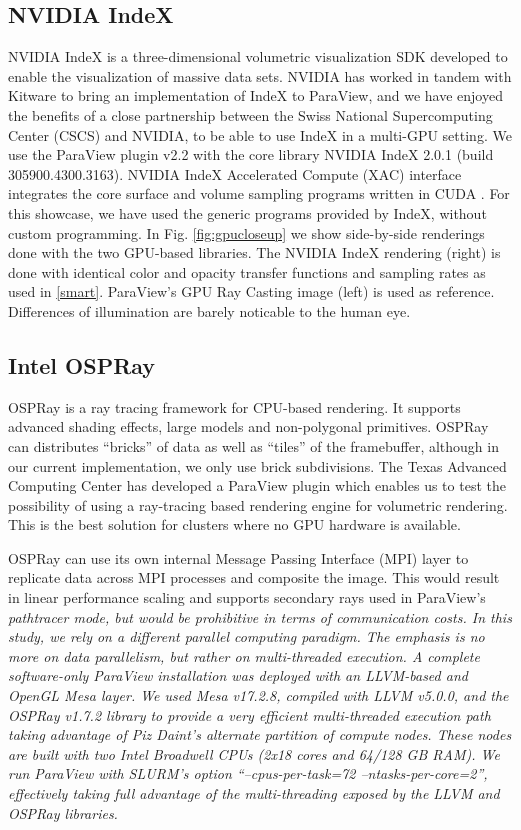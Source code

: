 \documentclass[5p,times]{elsarticle}
\begin{document}
\subsection{NVIDIA IndeX} \label{index}

NVIDIA IndeX \cite{NVIDIAIndeX} is a three-dimensional volumetric visualization SDK developed to enable
the visualization of massive data sets. NVIDIA has worked in tandem with Kitware to
bring an implementation of IndeX to ParaView, and we have enjoyed the benefits
of a close partnership between the Swiss National Supercomputing Center (CSCS)
and NVIDIA, to be able to use IndeX in a multi-GPU setting. We use the ParaView
plugin v2.2 with the core library NVIDIA IndeX 2.0.1 (build 305900.4300.3163).
NVIDIA IndeX Accelerated Compute (XAC) interface integrates the core surface
and volume sampling programs written in CUDA \cite{SC18IndexShowcase}.
For this showcase, we have used the generic programs provided by IndeX, without custom programming.
In Fig. \ref{fig:gpucloseup} we show side-by-side renderings done with the
two GPU-based libraries. The NVIDIA IndeX rendering (right) is done with identical
color and opacity transfer functions and sampling rates as used in \ref{smart}. ParaView's
GPU Ray Casting image (left) is used as reference. Differences of
illumination are barely noticable to the human eye.

\subsection{Intel OSPRay}

OSPRay \cite{OSPRay} is a ray tracing framework for CPU-based rendering. It supports advanced 
shading effects, large models and non-polygonal primitives. OSPRay can distributes 
``bricks'' of data as well as ``tiles'' of the framebuffer, although in our current
implementation, we only use brick subdivisions. The Texas Advanced Computing Center
has developed a ParaView plugin which enables us to test the possibility of
using a ray-tracing based rendering engine for volumetric rendering. This is
the best solution for clusters where no GPU hardware is available.

OSPRay can use its own internal Message Passing Interface (MPI) layer to replicate
data across MPI processes and composite the image. This would result in linear
performance scaling and supports secondary rays used in ParaView's \it{pathtracer} \rm mode,
but would be prohibitive in terms of communication costs.
In this study, we rely on a different parallel computing paradigm.
The emphasis is no more on data parallelism, but rather on multi-threaded execution.
A complete \it{software-only} \rm ParaView installation was deployed with an LLVM-based and
OpenGL Mesa layer. We used Mesa v17.2.8, compiled with LLVM v5.0.0, and the
OSPRay v1.7.2 library to provide a very efficient multi-threaded execution path
taking advantage of Piz Daint's alternate partition of compute nodes. These nodes
are built with two Intel Broadwell CPUs (2x18 cores and 64/128 GB RAM). We run
ParaView with SLURM's option ``--cpus-per-task=72 --ntasks-per-core=2'', effectively
taking full advantage of the multi-threading exposed by the LLVM and OSPRay libraries. 
\end{document}
